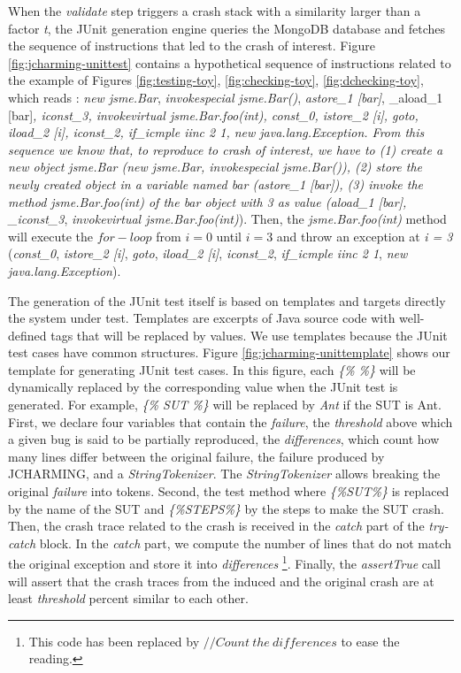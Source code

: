 \documentclass[12pt]{report}
\begin{document}
When the \emph{validate} step triggers a crash stack with a similarity
larger than a factor \emph{t}, the JUnit generation engine queries the
MongoDB database and fetches the sequence of instructions that led to
the crash of interest. Figure \ref{fig:jcharming-unittest} contains a
hypothetical sequence of instructions related to the example of Figures
\ref{fig:testing-toy}, \ref{fig:checking-toy}, \ref{fig:dchecking-toy},
which reads : \emph{new jsme.Bar}, \emph{invokespecial jsme.Bar()},
\emph{astore\_1 {[}bar{]}}, \_aload\_1 {[}bar{]}\emph{,
\emph{iconst\_3}, \emph{invokevirtual jsme.Bar.foo(int)},
\emph{const\_0}, \emph{istore\_2 {[}i{]}}, \emph{goto}, \emph{iload\_2
{[}i{]}}, \emph{iconst\_2}, \emph{if\_icmple iinc 2 1}, \emph{new
java.lang.Exception}. From this sequence we know that, to reproduce to
crash of interest, we have to (1) create a new object \emph{jsme.Bar}
(\emph{new jsme.Bar}, \emph{invokespecial jsme.Bar()}), (2) store the
newly created object in a variable named \emph{bar} (\emph{astore\_1
{[}bar{]}}), (3) invoke the method \emph{jsme.Bar.foo(int)} of the
\emph{bar} object with \emph{3} as value (\emph{aload\_1 {[}bar{]}},
\_iconst\_3}, \emph{invokevirtual jsme.Bar.foo(int)}). Then, the
\emph{jsme.Bar.foo(int)} method will execute the \(for-loop\) from
\(i=0\) until \(i=3\) and throw an exception at \emph{i = 3}
(\emph{const\_0}, \emph{istore\_2 {[}i{]}}, \emph{goto}, \emph{iload\_2
{[}i{]}}, \emph{iconst\_2}, \emph{if\_icmple iinc 2 1}, \emph{new
java.lang.Exception}).

The generation of the JUnit test itself is based on templates and
targets directly the system under test. Templates are excerpts of Java
source code with well-defined tags that will be replaced by values. We
use templates because the JUnit test cases have common structures.
Figure \ref{fig:jcharming-unittemplate} shows our template for
generating JUnit test cases. In this figure, each \emph{\{\% \%\}} will
be dynamically replaced by the corresponding value when the JUnit test
is generated. For example, \emph{\{\% SUT \%\}} will be replaced by
\emph{Ant} if the SUT is Ant. First, we declare four variables that
contain the \emph{failure}, the \emph{threshold} above which a given bug
is said to be partially reproduced, the \emph{differences}, which count
how many lines differ between the original failure, the failure produced
by JCHARMING, and a \emph{StringTokenizer}. The \emph{StringTokenizer}
allows breaking the original \emph{failure} into tokens. Second, the
test method where \emph{\{\%SUT\%\}} is replaced by the name of the SUT
and \emph{\{\%STEPS\%\}} by the steps to make the SUT crash. Then, the
crash trace related to the crash is received in the \emph{catch} part of
the \emph{try-catch} block. In the \emph{catch} part, we compute the
number of lines that do not match the original exception and store it
into \emph{differences}
\footnote{This code has been replaced by $//Count~the~differences$ to ease the reading.}.
Finally, the \emph{assertTrue} call will assert that the crash traces
from the induced and the original crash are at least \emph{threshold}
percent similar to each other.
\end{document}
